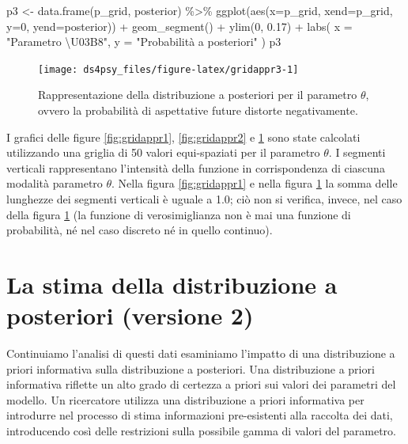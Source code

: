 \documentclass[
  11pt,
]{krantz}
\makeatletter
\newenvironment{Shaded}{\begin{snugshade}}{\end{snugshade}}
\newcommand{\AttributeTok}[1]{\textcolor[rgb]{0.61,0.61,0.61}{#1}}
\newcommand{\DecValTok}[1]{\textcolor[rgb]{0.06,0.06,0.06}{#1}}
\newcommand{\FloatTok}[1]{\textcolor[rgb]{0.06,0.06,0.06}{#1}}
\newcommand{\FunctionTok}[1]{\textcolor[rgb]{0,0,0}{#1}}
\newcommand{\NormalTok}[1]{#1}
\newcommand{\OtherTok}[1]{\textcolor[rgb]{0.37,0.37,0.37}{#1}}
\newcommand{\SpecialCharTok}[1]{\textcolor[rgb]{0,0,0}{#1}}
\newcommand{\StringTok}[1]{\textcolor[rgb]{0.5,0.5,0.5}{#1}}
\newenvironment{kframe}{%
\medskip{}
\setlength{\fboxsep}{.8em}
 \def\at@end@of@kframe{}%
 \ifinner\ifhmode%
  \def\at@end@of@kframe{\end{minipage}}%
  \begin{minipage}{\columnwidth}%
 \fi\fi%
 \def\FrameCommand##1{\hskip\@totalleftmargin \hskip-\fboxsep
 \colorbox{shadecolor}{##1}\hskip-\fboxsep
     \hskip-\linewidth \hskip-\@totalleftmargin \hskip\columnwidth}%
 \MakeFramed {\advance\hsize-\width
   \@totalleftmargin\z@ \linewidth\hsize
   \@setminipage}}%
 {\par\unskip\endMakeFramed%
 \at@end@of@kframe}
\renewenvironment{Shaded}{\begin{kframe}}{\end{kframe}}
\theoremstyle{definition}
\theoremstyle{definition}
\theoremstyle{definition}
\theoremstyle{definition}
\theoremstyle{remark}
\makeatother
\begin{document}
\begin{Shaded}
\begin{Highlighting}[]
\NormalTok{p3 }\OtherTok{\textless{}{-}} \FunctionTok{data.frame}\NormalTok{(p\_grid, posterior) }\SpecialCharTok{\%\textgreater{}\%}
  \FunctionTok{ggplot}\NormalTok{(}\FunctionTok{aes}\NormalTok{(}\AttributeTok{x=}\NormalTok{p\_grid, }\AttributeTok{xend=}\NormalTok{p\_grid, }\AttributeTok{y=}\DecValTok{0}\NormalTok{, }\AttributeTok{yend=}\NormalTok{posterior)) }\SpecialCharTok{+}
  \FunctionTok{geom\_segment}\NormalTok{() }\SpecialCharTok{+}
  \FunctionTok{ylim}\NormalTok{(}\DecValTok{0}\NormalTok{, }\FloatTok{0.17}\NormalTok{) }\SpecialCharTok{+}
  \FunctionTok{labs}\NormalTok{(}
    \AttributeTok{x =} \StringTok{"Parametro \textbackslash{}U03B8"}\NormalTok{,}
    \AttributeTok{y =} \StringTok{"Probabilità a posteriori"}
\NormalTok{  )}
\NormalTok{p3}
\end{Highlighting}
\end{Shaded}

\begin{figure}[h]

{\centering \texttt{[image: ds4psy\_files/figure-latex/gridappr3-1]} 

}

\caption{Rappresentazione della distribuzione a posteriori per il parametro $\theta$, ovvero la probabilità di aspettative future distorte negativamente.}\label{fig:gridappr3}
\end{figure}

I grafici delle figure \ref{fig:gridappr1}, \ref{fig:gridappr2} e \ref{fig:gridappr3} sono state calcolati utilizzando una griglia di 50 valori equi-spaziati per il parametro \(\theta\). I segmenti verticali rappresentano l'intensità della funzione in corrispondenza di ciascuna modalità parametro \(\theta\). Nella figura \ref{fig:gridappr1} e nella figura \ref{fig:gridappr3} la somma delle lunghezze dei segmenti verticali è uguale a 1.0; ciò non si verifica, invece, nel caso della figura \ref{fig:gridappr3} (la funzione di verosimiglianza non è mai una funzione di probabilità, né nel caso discreto né in quello continuo).

\hypertarget{es-depression-beta-2-10}{%
\section{La stima della distribuzione a posteriori (versione 2)}\label{es-depression-beta-2-10}}

Continuiamo l'analisi di questi dati esaminiamo l'impatto di una distribuzione a priori informativa sulla distribuzione a posteriori. Una distribuzione a priori informativa riflette un alto grado di certezza a priori sui valori dei parametri del modello. Un ricercatore utilizza una distribuzione a priori informativa per introdurre nel processo di stima informazioni pre-esistenti alla raccolta dei dati, introducendo così delle restrizioni sulla possibile gamma di valori del parametro.
\end{document}
